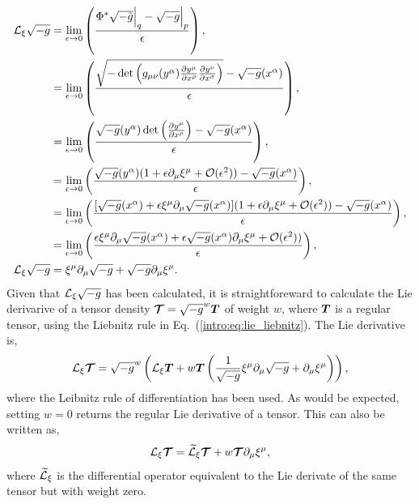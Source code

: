 \begin{align}
\mathcal{L}_\xi \sqrt{-g} &= \lim_{\epsilon\rightarrow 0 }\left( \frac{\Phi^*\sqrt{-\tilde{g}}\Big|_q-\sqrt{-g}\Big|_p}{\epsilon} \right) ,\\
&= \lim_{\epsilon\rightarrow 0 }\left( \frac{\sqrt{-\det\left(g_{\mu\nu}(y^\alpha){\frac{\partial y^\mu}{\partial x^\rho}  \frac{\partial y^\nu}{\partial x^\sigma}}\right)}-\sqrt{-g}(x^\alpha)}{\epsilon} \right) ,\\
&= \lim_{\epsilon\rightarrow 0 }\left( \frac{\sqrt{-g}(y^\alpha) \det\left(\frac{\partial y^\mu}{\partial x^\rho}\right) -\sqrt{-g}(x^\alpha)}{\epsilon} \right) ,\\
&= \lim_{\epsilon\rightarrow 0 }\left( \frac{\sqrt{-g}(y^\alpha) (1 + \epsilon \partial_\mu \xi^\mu + \mathcal{O}(\epsilon^2)) -\sqrt{-g}(x^\alpha)}{\epsilon} \right) ,\\
&= \lim_{\epsilon\rightarrow 0 }\left( \frac{[\sqrt{-g}(x^\alpha) + \epsilon \xi^\mu \partial_\mu \sqrt{-g}(x^\alpha)] (1 + \epsilon \partial_\mu \xi^\mu + \mathcal{O}(\epsilon^2)) -\sqrt{-g}(x^\alpha)}{\epsilon} \right) ,\\
&= \lim_{\epsilon\rightarrow 0 }\left( \frac{ \epsilon \xi^\mu \partial_\mu \sqrt{-g}(x^\alpha) + \epsilon \sqrt{-g}(x^\alpha)\partial_\mu \xi^\mu + \mathcal{O}(\epsilon^2))}{\epsilon}  \right) ,\\
\mathcal{L}_\xi \sqrt{-g} &= \xi^\mu \partial_\mu \sqrt{-g} + \sqrt{-g} \partial_\mu \xi^\mu.
\end{align}
Given that $\mathcal{L}_\xi \sqrt{-g}$ has been calculated, it is straightforeward to calculate the Lie derivarive of a tensor density $\boldsymbol{\mathcal{T}} = \sqrt{-g}^w\boldsymbol{T}$ of weight $w$, where $\boldsymbol{T}$ is a regular tensor, using the Liebnitz rule in Eq.~(\ref{intro:eq:lie_liebnitz}). The Lie derivative is,
\begin{equation} \label{intro:eq:Ltensordensity}
\mathcal{L}_\xi \boldsymbol{\mathcal{T}} = \sqrt{-g}^w \left( \mathcal{L}_\xi \boldsymbol{T} + w \boldsymbol{T} \left(   \frac{1}{\sqrt{-g}} \xi^\mu \partial_\mu \sqrt{-g} + \partial_\mu \xi^\mu \right) \right),
\end{equation}
where the Leibnitz rule of differentiation has been used. As would be expected, setting $w=0$ returns the regular Lie derivative of a tensor. This can also be written as, 
\begin{equation} \label{intro:eq:Ltensordensity2}
\mathcal{L}_\xi \boldsymbol{\mathcal{T}} =  \widetilde{\mathcal{L}}_\xi \boldsymbol{\mathcal{T}} + w \boldsymbol{\mathcal{T}}  \partial_\mu \xi^\mu ,
\end{equation}
where $ \widetilde{\mathcal{L}}_\xi$ is the differential operator equivalent to the Lie derivate of the same tensor but with weight zero.

